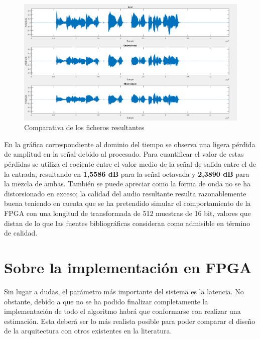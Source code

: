 \begin{figure}[!bht]
\begin{center}
\includegraphics[width=15cm]{img/testAlTime.png}
\caption{\label{fig:testTime}Comparativa de los ficheros resultantes}
\end{center}
\end{figure}

En la gráfica correspondiente al dominio del tiempo se observa una ligera pérdida de amplitud en la señal debido al procesado. Para cuantificar el valor de estas pérdidas se utiliza el cociente entre el valor medio de la señal de salida entre el de la entrada, resultando en \textbf{1,5586 dB} para la señal octavada y \textbf{2,3890 dB} para la mezcla de ambas. También se puede apreciar como la forma de onda no se ha distorsionado en exceso; la calidad del audio resultante resulta razonablemente buena teniendo en cuenta que se ha pretendido simular el comportamiento de la FPGA con una longitud de transformada de 512 muestras de 16 bit, valores que distan de lo que las fuentes bibliográficas consideran como admisible en término de calidad.

\section{Sobre la implementación en FPGA}

Sin lugar a dudas, el parámetro más importante del sistema es la latencia. No obstante, debido a que no se ha podido finalizar completamente la implementación de todo el algoritmo habrá que conformarse con realizar una estimación. Esta deberá ser lo más realista posible para poder comparar el diseño de la arquitectura con otros existentes en la literatura.

